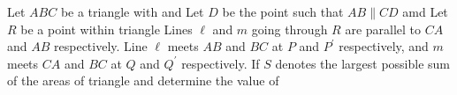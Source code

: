 Let $ABC$ be a triangle with   and   Let $D$ be the point such that $AB\parallel CD$ amd   Let $R$ be a point within triangle   Lines $\ell$ and $m$ going through $R$ are parallel to $CA$ and $AB$ respectively.  Line $\ell$ meets $AB$ and $BC$ at $P$ and $P^\prime$ respectively, and $m$ meets $CA$ and $BC$ at $Q$ and $Q^\prime$ respectively.  If $S$ denotes the largest possible sum of the areas of triangle   and  determine the value of 